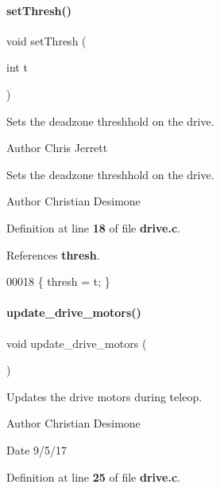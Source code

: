 \paragraph{set\+Thresh()}
{\footnotesize\ttfamily void set\+Thresh (\begin{DoxyParamCaption}\item[{int}]{t }\end{DoxyParamCaption})}



Sets the deadzone threshhold on the drive. 

\begin{DoxyAuthor}{Author}
Chris Jerrett
\end{DoxyAuthor}
Sets the deadzone threshhold on the drive.

\begin{DoxyAuthor}{Author}
Christian Desimone 
\end{DoxyAuthor}


Definition at line \textbf{ 18} of file \textbf{ drive.\+c}.



References \textbf{ thresh}.


\begin{DoxyCode}
00018 \{ thresh = t; \}
\end{DoxyCode}
\mbox{\label{drive_8h_a8224a4626a934d30ed587671b7004bf8}} 
\paragraph{update\+\_\+drive\+\_\+motors()}
{\footnotesize\ttfamily void update\+\_\+drive\+\_\+motors (\begin{DoxyParamCaption}{ }\end{DoxyParamCaption})}



Updates the drive motors during teleop. 

\begin{DoxyAuthor}{Author}
Christian Desimone 
\end{DoxyAuthor}
\begin{DoxyDate}{Date}
9/5/17 
\end{DoxyDate}


Definition at line \textbf{ 25} of file \textbf{ drive.\+c}.



